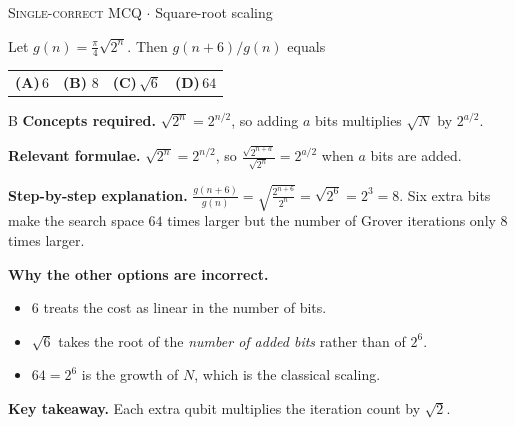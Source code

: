 \documentclass[11pt,a4paper]{article}
\newcommand{\optlabel}[1]{\textbf{(#1)}}
\newcommand{\correctlabel}[1]{\textcolor{okgreen}{\textbf{(#1)}\,\ding{51}}}
\newenvironment{qitem}[1]{\begin{list}{}{\setlength{\leftmargin}{3.3em}\setlength{\labelwidth}{3.1em}%
  \setlength{\labelsep}{0.2em}\setlength{\topsep}{3pt}\setlength{\parsep}{3pt}}\item[\textbf{Q.#1}\hfill]}{\end{list}}
\newcommand{\qsep}{\par\vspace{2pt}{\color{black!15}\hrule}\vspace{4pt}}
\newcommand{\qmeta}[2]{{\footnotesize\color{black!60}\textsc{#1} \;$\cdot$\; #2}\par}
\begin{document}
\begin{qitem}{13}
\qmeta{Single-correct MCQ}{Square-root scaling}
Let $g(n) = \tfrac\pi4\sqrt{2^n}$. Then $g(n + 6)/g(n)$ equals
\par\smallskip\noindent\begin{tabularx}{\linewidth}{@{}*{4}{L}@{}}
\optlabel{A}\,$6$ & \correctlabel{B}\,$8$ & \optlabel{C}\,$\sqrt6$ & \optlabel{D}\,$64$
\end{tabularx}
\end{qitem}
\begin{solbox}{B}
\textbf{\color{brand}Concepts required.} $\sqrt{2^{n}} = 2^{n/2}$, so adding $a$ bits multiplies $\sqrt N$ by $2^{a/2}$.

\textbf{\color{brand}Relevant formulae.} $\sqrt{2^{n}} = 2^{n/2}$, so $\frac{\sqrt{2^{n+a}}}{\sqrt{2^n}} = 2^{a/2}$ when $a$ bits are added.

\textbf{\color{brand}Step-by-step explanation.} $\frac{g(n+6)}{g(n)} = \sqrt{\frac{2^{n+6}}{2^n}} = \sqrt{2^6} = 2^3 = 8$. Six extra bits make the search space $64$ times larger but the
number of Grover iterations only $8$ times larger.

\textbf{\color{brand}Why the other options are incorrect.}
\begin{itemize}[leftmargin=2.4em, itemsep=1pt, topsep=2pt]
\item[\textbf{(A)}] $6$ treats the cost as linear in the number of bits.
\item[\textbf{(C)}] $\sqrt6$ takes the root of the \emph{number of added bits} rather than of $2^6$.
\item[\textbf{(D)}] $64 = 2^6$ is the growth of $N$, which is the classical scaling.
\end{itemize}
\textbf{\color{brand}Key takeaway.} Each extra qubit multiplies the iteration count by $\sqrt2$.
\end{solbox}
\qsep
\end{document}
